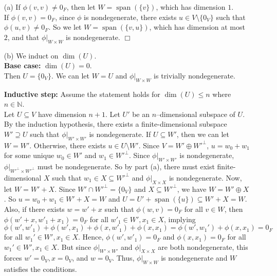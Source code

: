\documentclass[12pt]{article}
\DeclareMathOperator{\spn}{span}
\begin{document}
\begin{enumerate}
    \item[(a)] If $\phi(v, v) \ne 0_F$, then let $W = \spn(\{v\})$, which has dimension $1$. \\
    If $\phi(v, v) = 0_F$, since $\phi$ is nondegenerate, there exists $u \in V \setminus \{0_V\}$ such that $\phi(u, v) \ne 0_F$. So we let $W = \spn(\{v, u\})$, which has dimension at most $2$, and that $\phi|_{W \times W}$ is nondegenerate. \hfill $\Box$
    \item[(b)] We induct on $\dim(U)$. \\
    \textbf{Base case:} $\dim(U) = 0$. \\
    Then $U = \{0_V\}$. We can let $W = U$ and $\phi|_{W \times W}$ is trivially nondegenerate. 

    \textbf{Inductive step:} Assume the statement holds for $\dim(U) \le n$ where $n \in \mathbb{N}$. \\
    Let $U \subseteq V$ have dimension $n + 1$.  Let $U'$ be an $n$--dimensional subspace of $U$. By the induction hypothesis, there exists a finite-dimensional subspace $W' \supseteq U$ such that $\phi|_{W' \times W'}$ is nondegenerate. If $U \subseteq W'$, then we can let $W = W'$. Otherwise, there exists $u \in U \setminus W'$. Since $V = W' \oplus W'^\perp$, $u = w_0 + w_1$ for some unique $w_0 \in W'$ and $w_1 \in W'^\perp$. Since $\phi|_{W' \times W'}$ is nondegenerate, $\phi|_{W'^\perp \times W'^\perp}$ must be nondegenerate. So by part (a), there must exist finite-dimensional $X$ such that $w_1 \in X \subseteq W'^\perp$ and $\phi|_{X \times X}$ is nondegenerate. Now, let $W = W' + X$. Since $W' \cap W'^\perp = \{0_V\}$ and $X \subseteq W'^\perp$, we have $W = W' \oplus X$. So $u = w_0 + w_1 \in W' + X = W$ and $U = U' + \spn(\{u\}) \subseteq W' + X = W$. Also, if there exists $w = w' + x$ such that $\phi(w, v) = 0_F$ for all $v \in W$, then $\phi(w' + x, w'_1 + x_1) = 0_F$ for all $w'_1 \in W', x_1 \in X$, implying $\phi(w', w'_1) + \phi(w', x_1) + \phi(x, w'_1) + \phi(x, x_1) = \phi(w', w_1') + \phi(x, x_1) = 0_F$ for all $w_1' \in W', x_1 \in X$. Hence, $\phi(w', w'_1) = 0_F$ and $\phi(x, x_1) = 0_F$ for all $w_1' \in W', x_1 \in X$. But since $\phi|_{W' \times W'}$ and $\phi|_{X \times X}$ are both nondegenerate, this forces $w' = 0_V, x = 0_V$, and $w = 0_V$. Thus, $\phi|_{W \times W}$ is nondegenerate and $W$ satisfies the conditions.


\end{enumerate}
\end{document}
